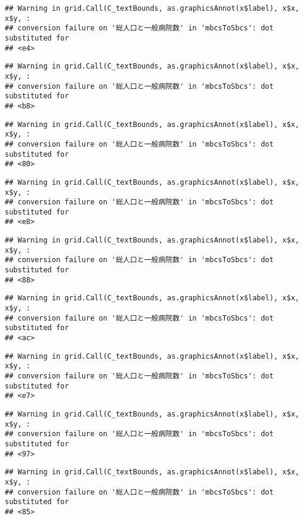 \documentclass[
]{article}
\begin{document}
\begin{verbatim}
## Warning in grid.Call(C_textBounds, as.graphicsAnnot(x$label), x$x, x$y, :
## conversion failure on '総人口と一般病院数' in 'mbcsToSbcs': dot substituted for
## <e4>
\end{verbatim}

\begin{verbatim}
## Warning in grid.Call(C_textBounds, as.graphicsAnnot(x$label), x$x, x$y, :
## conversion failure on '総人口と一般病院数' in 'mbcsToSbcs': dot substituted for
## <b8>
\end{verbatim}

\begin{verbatim}
## Warning in grid.Call(C_textBounds, as.graphicsAnnot(x$label), x$x, x$y, :
## conversion failure on '総人口と一般病院数' in 'mbcsToSbcs': dot substituted for
## <80>
\end{verbatim}

\begin{verbatim}
## Warning in grid.Call(C_textBounds, as.graphicsAnnot(x$label), x$x, x$y, :
## conversion failure on '総人口と一般病院数' in 'mbcsToSbcs': dot substituted for
## <e8>
\end{verbatim}

\begin{verbatim}
## Warning in grid.Call(C_textBounds, as.graphicsAnnot(x$label), x$x, x$y, :
## conversion failure on '総人口と一般病院数' in 'mbcsToSbcs': dot substituted for
## <88>
\end{verbatim}

\begin{verbatim}
## Warning in grid.Call(C_textBounds, as.graphicsAnnot(x$label), x$x, x$y, :
## conversion failure on '総人口と一般病院数' in 'mbcsToSbcs': dot substituted for
## <ac>
\end{verbatim}

\begin{verbatim}
## Warning in grid.Call(C_textBounds, as.graphicsAnnot(x$label), x$x, x$y, :
## conversion failure on '総人口と一般病院数' in 'mbcsToSbcs': dot substituted for
## <e7>
\end{verbatim}

\begin{verbatim}
## Warning in grid.Call(C_textBounds, as.graphicsAnnot(x$label), x$x, x$y, :
## conversion failure on '総人口と一般病院数' in 'mbcsToSbcs': dot substituted for
## <97>
\end{verbatim}

\begin{verbatim}
## Warning in grid.Call(C_textBounds, as.graphicsAnnot(x$label), x$x, x$y, :
## conversion failure on '総人口と一般病院数' in 'mbcsToSbcs': dot substituted for
## <85>
\end{verbatim}
\end{document}
